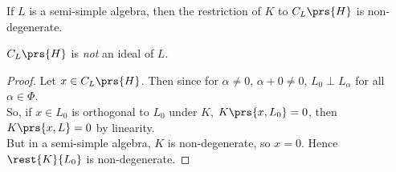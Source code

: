 \documentclass[10pt,a4paper,twoside,openany,hidelinks]{book}
\begin{document}
\begin{proposition}
If $L$ is a semi-simple algebra, then the restriction of $K$ to $C_L\prs{H}$ is non-degenerate.
\end{proposition}
\begin{remark}
$C_L\prs{H}$ is \emph{not} an ideal of $L$.
\end{remark}
\begin{proof}
Let $x \in C_L\prs{H}$. Then since for $\alpha \neq 0$, $\alpha + 0 \neq 0$, $L_0 \perp L_{\alpha}$ for all $\alpha \in \Phi$.\\
So, if $x \in L_0$ is orthogonal to $L_0$ under $K$, $K\prs{x,L_0} = 0$, then $K\prs{x,L} = 0$ by linearity.\\
But in a semi-simple algebra, $K$ is non-degenerate, so $x = 0$. Hence $\rest{K}{L_0}$ is non-degenerate.
\end{proof}
\end{document}
